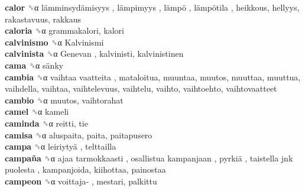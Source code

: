 \textbf{calor} ␝α   lämminsydämisyys ,  lämpimyys ,  lämpö ,  lämpötila , heikkous, hellyys, rakastavuus, rakkaus  \\
\textbf{caloria} ␝α  grammakalori, kalori  \\
\textbf{calvinismo} ␝α   Kalvinismi   \\
\textbf{calvinista} ␝α   Genevan , kalvinisti, kalvinistinen  \\
\textbf{cama} ␝α   sänky   \\
\textbf{cambia} ␝α   vaihtaa vaatteita , mataloitua, muuntaa, muutos, muuttaa, muuttua, vaihdella, vaihtaa, vaihtelevuus, vaihtelu, vaihto, vaihtoehto, vaihtovaatteet  \\
\textbf{cambio} ␝α  muutos, vaihtorahat  \\
\textbf{camel} ␝α  kameli  \\
\textbf{caminda} ␝α  reitti, tie  \\
\textbf{camisa} ␝α  aluspaita, paita, paitapusero  \\
\textbf{campa} ␝α   leiriytyä , telttailla  \\
\textbf{campaña} ␝α   ajaa tarmokkaasti ,  osallistua kampanjaan ,  pyrkiä ,  taistella jnk puolesta , kampanjoida, kiihottaa, painostaa  \\
\textbf{campeon} ␝α   voittaja- , mestari, palkittu  \\
